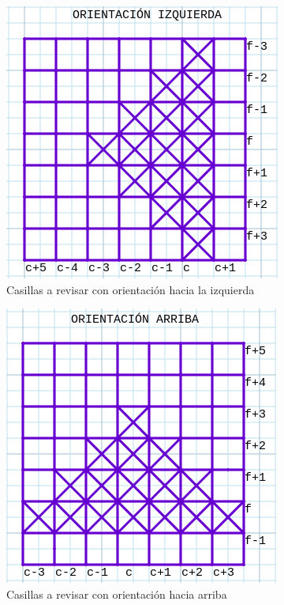 \begin{figure}[H] %
	\centering
	\includegraphics[scale=0.6]{or-izq.png}  %
	\caption{Casillas a revisar con orientación hacia la izquierda} 
	\label{fig:orientación-izq}
\end{figure}

\begin{figure}[H] %
	\centering
	\includegraphics[scale=0.6]{or-arr.png}  %
	\caption{Casillas a revisar con orientación hacia arriba} 
	\label{fig:orientación-arr}
\end{figure}

